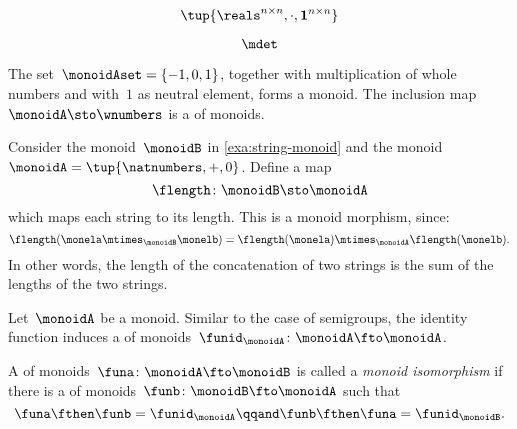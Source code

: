 {\begin{forslides}
        \begin{equation}
            \label{eq:matrices-times}
            \tup{\reals^{n\times n}, \cdot, \mathbf{1}^{n\times n}}
        \end{equation}
        
        \begin{equation}
            \label{eq:det}
            \mdet
        \end{equation}
    \end{forslides}
}%

\begin{example}
    The set~$\monoidAset = \{ -1, 0, 1 \}$, together with multiplication of whole numbers and with~$1$ as neutral element, forms a monoid.
    The inclusion map~$\monoidA \sto \wnumbers$ is a \whomo of monoids.
\end{example}

\begin{example}
    \label{exa:string-length}
    Consider the monoid~$\monoidB$ in \cref{exa:string-monoid} and the monoid~$\monoidA=\tup{\natnumbers, +,0}$.
    Define a map
    \begin{equation*}
        \flength \colon \monoidB \sto \monoidA
    \end{equation*}
    which maps each string to its length. This is a monoid morphism, since:
    \begin{equation*}
        \flength(\monela \mtimes_\monoidB \monelb)=\flength(\monela)\mtimes_\monoidA \flength(\monelb).
    \end{equation*}
    In other words, the length of the concatenation of two strings is the sum of the lengths of the two strings.
\end{example}

\begin{definition}
    \label{def:identity-mon-mor}
    Let~$\monoidA$ be a monoid. Similar to the case of semigroups, the identity function induces a \whomo of monoids~$\funid_\monoidA\colon \monoidA \fto \monoidA$.
\end{definition}



\begin{definition}
    \label{def:monoid-iso}
    A \whomo of monoids~$\funa\colon \monoidA \fto \monoidB$ is called a \emph{monoid isomorphism} if there is a \whomo of monoids~$\funb\colon \monoidB \fto \monoidA$ such that
    \begin{equation}
        \funa \fthen \funb = \funid_\monoidA \qqand \funb \fthen \funa = \funid_\monoidB.
    \end{equation}
\end{definition}


